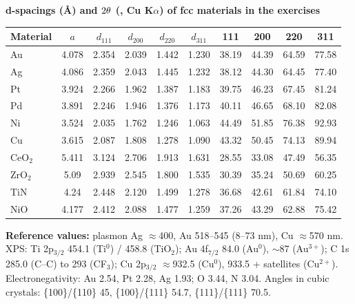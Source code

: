 \noindent\textbf{d-spacings (\AA) and $2\theta$ (\textdegree, Cu K$\alpha$) of fcc materials in the exercises}\extra
\begin{center}
\small
\setlength{\tabcolsep}{4pt}
\begin{tabular}{@{}lc|cccc|cccc@{}}
\toprule
Material & $a$ & $d_{111}$ & $d_{200}$ & $d_{220}$ & $d_{311}$ & 111 & 200 & 220 & 311 \\ \midrule
Au & 4.078 & 2.354 & 2.039 & 1.442 & 1.230 & 38.19 & 44.39 & 64.59 & 77.58 \\
Ag & 4.086 & 2.359 & 2.043 & 1.445 & 1.232 & 38.12 & 44.30 & 64.45 & 77.40 \\
Pt & 3.924 & 2.266 & 1.962 & 1.387 & 1.183 & 39.75 & 46.23 & 67.45 & 81.24 \\
Pd & 3.891 & 2.246 & 1.946 & 1.376 & 1.173 & 40.11 & 46.65 & 68.10 & 82.08 \\
Ni & 3.524 & 2.035 & 1.762 & 1.246 & 1.063 & 44.49 & 51.85 & 76.38 & 92.93 \\
Cu & 3.615 & 2.087 & 1.808 & 1.278 & 1.090 & 43.32 & 50.45 & 74.13 & 89.94 \\
CeO$_2$ & 5.411 & 3.124 & 2.706 & 1.913 & 1.631 & 28.55 & 33.08 & 47.49 & 56.35 \\
ZrO$_2$ & 5.09 & 2.939 & 2.545 & 1.800 & 1.535 & 30.39 & 35.24 & 50.69 & 60.25 \\
TiN & 4.24 & 2.448 & 2.120 & 1.499 & 1.278 & 36.68 & 42.61 & 61.84 & 74.10 \\
NiO & 4.177 & 2.412 & 2.088 & 1.477 & 1.259 & 37.26 & 43.29 & 62.88 & 75.42 \\
\bottomrule
\end{tabular}
\end{center}

\noindent\textbf{Reference values:} plasmon Ag $\approx$400, Au 518--545 (8--73 nm), Cu $\approx$570 nm.
XPS: Ti 2p$_{3/2}$ 454.1 (Ti$^0$) / 458.8 (TiO$_2$); Au 4f$_{7/2}$ 84.0 (Au$^0$), $\sim$87 (Au$^{3+}$); C 1s 285.0 (C--C) to
293 (CF$_3$); Cu 2p$_{3/2}$ $\approx$932.5 (Cu$^0$), 933.5 + satellites (Cu$^{2+}$)\extra.
Electronegativity: Au 2.54, Pt 2.28, Ag 1.93; O 3.44, N 3.04\extra.
Angles in cubic crystals: \{100\}/\{110\} 45\textdegree, \{100\}/\{111\} 54.7\textdegree, \{111\}/\{111\} 70.5\textdegree.
